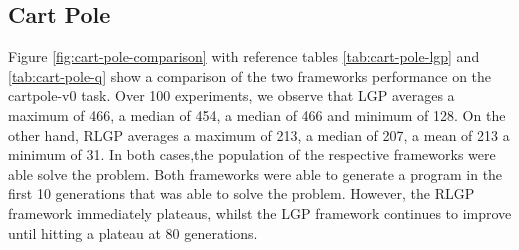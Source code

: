 \documentclass[12pt, final]{dalcsthesis}
\begin{document}
\subsection{Cart Pole}

Figure \ref{fig:cart-pole-comparison} with reference tables \ref{tab:cart-pole-lgp} and \ref{tab:cart-pole-q} show a comparison of the two frameworks performance on the cartpole-v0 task. 
Over 100 experiments, we observe that LGP averages a maximum of 466, a median of 454, a median of 466 and minimum of 128. On the other hand, RLGP
averages a maximum of 213, a median of 207, a mean of 213 a minimum of 31. In both cases,the population of the respective frameworks were able solve the problem. Both frameworks were able
to generate a program in the first 10 generations that was able to solve the problem. However, the RLGP framework immediately plateaus, whilst the LGP framework continues to improve until hitting a plateau at 80 generations.
\end{document}
